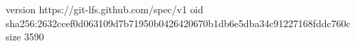 version https://git-lfs.github.com/spec/v1
oid sha256:2632ccef0d063109d7b71950b0426420670b1db6e5dba34c91227168fddc760c
size 3590
